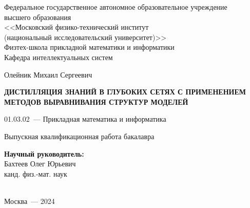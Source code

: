 \thispagestyle{empty}

\begin{titlepage}
    \begin{center}
        Федеральное государственное автономное образовательное учреждение\\ высшего образования\\
        <<Московский физико-технический институт\\
        (национальный исследовательский университет)>>\\
        Физтех-школа прикладной математики и информатики\\
        Кафедра интеллектуальных систем
    \end{center}
    \vspace{0pt plus5fill}
    \begin{center}
        \large{Олейник Михаил Сергеевич}
    \end{center}
    \vspace{0pt}
    \begin{center}
        \textbf{\large{\MakeUppercase{Дистилляция знаний в глубоких сетях с применением методов выравнивания структур моделей}}}
    \end{center}
    \vspace{0pt}
    \begin{center}
        01.03.02~--- Прикладная математика и информатика
    \end{center}
    \vspace{0pt}
    \begin{center}
        Выпускная квалификационная работа бакалавра
    \end{center}
    \vspace{0pt plus2fill}
    \begin{center}
        \hfill\parbox{8,4cm}{\textbf{Научный руководитель:}\\
            Бахтеев Олег Юрьевич\\
            канд. физ.-мат. наук}\\
        \vspace{0pt plus4fill}
        Москва~--- 2024
    \end{center}
\end{titlepage}